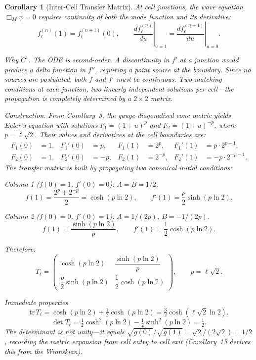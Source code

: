 \documentclass[12pt]{amsart}
\newtheorem{corollary}{Corollary}
\begin{document}
\begin{corollary}[Inter-Cell Transfer Matrix]
At cell junctions, the wave equation $\Box_M \psi = 0$ requires continuity of both the mode
function and its derivative:
\[
  f_\ell^{(n)}(1) = f_\ell^{(n+1)}(0), \qquad
  \left.\frac{df_\ell^{(n)}}{du}\right|_{u=1}
    = \left.\frac{df_\ell^{(n+1)}}{du}\right|_{u=0}.
\]

\textit{Why $C^1$.} The ODE is second-order. A discontinuity in $f'$ at a junction would
produce a delta function in $f''$, requiring a point source at the boundary. Since no sources
are postulated, both $f$ and $f'$ must be continuous. Two matching conditions at each junction,
two linearly independent solutions per cell---the propagation is completely determined by a
$2 \times 2$ matrix.

\textit{Construction.} From Corollary~8, the gauge-diagonalised cone metric yields Euler's
equation with solutions $F_1 = (1+u)^p$ and $F_2 = (1+u)^{-p}$, where $p = \ell\sqrt{2}$.
Their values and derivatives at the cell boundaries are:
\begin{align*}
  F_1(0) &= 1, & F_1'(0) &= p, & F_1(1) &= 2^p, & F_1'(1) &= p \cdot 2^{p-1}, \\
  F_2(0) &= 1, & F_2'(0) &= -p, & F_2(1) &= 2^{-p}, & F_2'(1) &= -p \cdot 2^{-p-1}.
\end{align*}
The transfer matrix is built by propagating two canonical initial conditions:

\textit{Column 1} ($f(0)=1$, $f'(0)=0$): $A = B = 1/2$.
\[
  f(1) = \frac{2^p + 2^{-p}}{2} = \cosh(p\ln 2), \qquad
  f'(1) = \frac{p}{2}\sinh(p\ln 2).
\]

\textit{Column 2} ($f(0)=0$, $f'(0)=1$): $A = 1/(2p)$, $B = -1/(2p)$.
\[
  f(1) = \frac{\sinh(p\ln 2)}{p}, \qquad
  f'(1) = \frac{1}{2}\cosh(p\ln 2).
\]

Therefore:
\[
  T_\ell = \begin{pmatrix}
    \cosh(p\ln 2) & \dfrac{\sinh(p\ln 2)}{p} \\[8pt]
    \dfrac{p}{2}\sinh(p\ln 2) & \dfrac{1}{2}\cosh(p\ln 2)
  \end{pmatrix}, \qquad p = \ell\sqrt{2}.
\]

\textit{Immediate properties.}
\[
  \mathrm{tr}\, T_\ell = \cosh(p\ln 2) + \tfrac{1}{2}\cosh(p\ln 2)
    = \tfrac{3}{2}\cosh(\ell\sqrt{2}\ln 2).
\]
\[
  \det T_\ell = \tfrac{1}{2}\cosh^2(p\ln 2) - \tfrac{1}{2}\sinh^2(p\ln 2) = \tfrac{1}{2}.
\]
The determinant is not unity---it equals
$\sqrt{g(0)}/\sqrt{g(1)} = \sqrt{2}/(2\sqrt{2}) = 1/2$, recording the metric expansion from
cell entry to cell exit (Corollary~13 derives this from the Wronskian).


\end{corollary}
\end{document}
